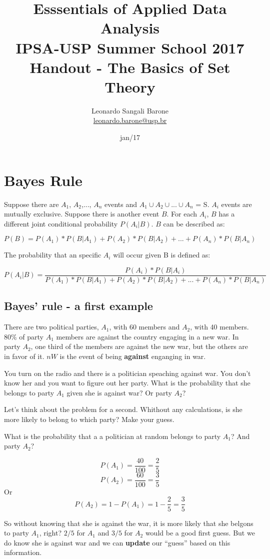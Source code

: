 \documentclass[11pt]{article}
\title{\textbf{Esssentials of Applied Data Analysis\\
				IPSA-USP Summer School 2017}\newline\\
				Handout - The Basics of Set Theory}
\author{Leonardo Sangali Barone\\ \href{leonardo.barone@usp.br}{leonardo.barone@usp.br}}
\date{jan/17}
\begin{document}
\maketitle

\section*{Bayes Rule}

	Suppose there are $A_1$, $A_2$,..., $A_n$ events and $A_1 \cup A_2 \cup... \cup A_n$ = S. $A_i$ events are mutually exclusive. Suppose there is another event $B$. For each $A_i$, $B$ has a different joint conditional probability $P(A_i|B)$. $B$ can be described as:
	
	\[P(B) = P(A_1)*P(B|A_1)+P(A_2)*P(B|A_2)+...+P(A_n)*P(B|A_n)\]
 
	The probability that an specific $A_i$ will occur given B is defined as:

	\[P(A_i|B) = \frac{P(A_i)*P(B|A_i)}{P(A_1)*P(B|A_1)+P(A_2)*P(B|A_2)+...+P(A_n)*P(B|A_n)}\]
		
	\subsection*{Bayes' rule - a first example}
	
	There are two political parties, $A_1$, with 60 members and $A_2$, with 40 members. $80\%$ of party $A_1$ members are against the country engaging in a new war. In party $A_2$, one third of the members are against the new war, but the others are in favor of it. $nW$ is the event of being \textbf{against} enganging in war.

	You turn on the radio and there is a politician speaching against war. You don't know her and you want to figure out her party. What is the probability that she belongs to party $A_1$ given she is against war? Or party $A_2$?
		
	Let's think about the problem for a second. Whithout any calculations, is she more likely to belong to which party? Make your guess.
	
	What is the probability that a a politician at random belongs to party $A_1$? And party $A_2$?
	
	\[P(A_1) = \frac{40}{100} = \frac{2}{5} \]
	\[P(A_2) = \frac{60}{100} = \frac{3}{5} \]
Or
	\[P(A_2) = 1 - P(A_1) = 1 - \frac{2}{5} = \frac{3}{5}\]
	
	So without knowing that she is against the war, it is more likely that she belgons to party $A_1$, right? $2/5$ for $A_1$ and $3/5$ for $A_2$ would be a good first guess. But we do know she is against war and we can \textbf{update} our ``guess'' based on this information.
\end{document}

